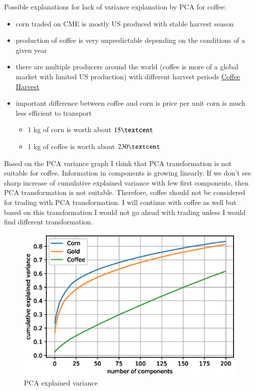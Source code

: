 \documentclass[final,2p]{elsarticle}
\begin{document}
Possible explanations for lack of variance explanation by PCA for coffee:
\begin{itemize}
    \item corn traded on CME is mostly US produced with stable harvest season
    \item production of coffee is very unpredictable depending on the conditions of a given year
    \item there are multiple producers around the world (coffee is more of a global market with limited US production) with different harvest periods \href{https://driftaway.coffee/when-is-coffee-harvested/}{Coffee Harvest}
    \item important difference between coffee and corn is price per unit corn is much less efficient to transport
        \begin{itemize}
            \item 1 kg of corn is worth about $15\textcent$
            \item 1 kg of coffee is worth about $230\textcent$
        \end{itemize}
\end{itemize}
    
Based on the PCA variance graph I think that PCA transformation is not suitable for coffee. Information in components is growing linearly. If we don't see sharp increase of cumulative explained variance with few first components, then PCA transformation is not suitable. Therefore, coffee should not be considered for trading with PCA transformation. I will continue with coffee as well but based on this transformation I would not go ahead with trading unless I would find different transformation.
\begin{figure}[h]
    \centering
    \includegraphics{figures/pca.eps}
    \caption{PCA explained variance}
\end{figure}
\end{document}
